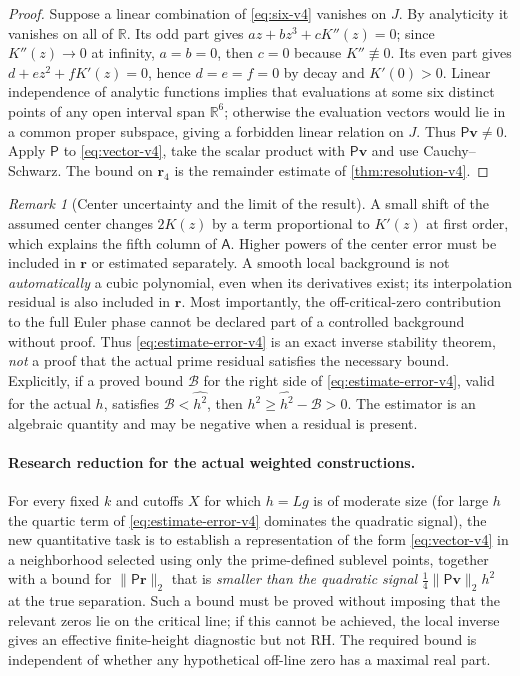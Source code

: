 \documentclass[11pt,a4paper]{article}
\numberwithin{equation}{section}
\theoremstyle{definition}
\theoremstyle{remark}
\newtheorem{remark}[theorem]{Remark}
\begin{document}
\begin{proof}
Suppose a linear combination of \eqref{eq:six-v4} vanishes on $J$.
By analyticity it vanishes on all of $\mathbb R$. Its odd part gives
$az+bz^3+cK''(z)=0$; since $K''(z)\to0$ at infinity,
$a=b=0$, then $c=0$ because $K''\not\equiv0$.
Its even part gives $d+ez^2+fK'(z)=0$, hence
$d=e=f=0$ by decay and $K'(0)>0$.
Linear independence of analytic functions implies that evaluations
at some six distinct points of any open interval span $\mathbb R^6$;
otherwise the evaluation vectors would lie in a common proper
subspace, giving a forbidden linear relation on $J$.
Thus $\mathsf P\mathbf v\ne0$. Apply $\mathsf P$ to
\eqref{eq:vector-v4}, take the scalar product with
$\mathsf P\mathbf v$ and use Cauchy--Schwarz. The bound on
$\mathbf r_4$ is the remainder estimate of \cref{thm:resolution-v4}.
\end{proof}

\begin{remark}[Center uncertainty and the limit of the result]
A small shift of the assumed center changes $2K(z)$ by a term
proportional to $K'(z)$ at first order, which explains the fifth
column of $\mathsf A$. Higher powers of the center error must be
included in $\mathbf r$ or estimated separately. A smooth local
background is not \emph{automatically} a cubic polynomial, even when
its derivatives exist; its interpolation residual is also included
in $\mathbf r$. Most importantly, the off-critical-zero contribution
to the full Euler phase cannot be declared part of a controlled
background without proof. Thus \eqref{eq:estimate-error-v4} is
an exact inverse stability theorem, \emph{not} a proof that the
actual prime residual satisfies the necessary bound. Explicitly, if a
proved bound $\mathcal B$ for the right side of
\eqref{eq:estimate-error-v4}, valid for the actual $h$, satisfies $\mathcal B<\widehat{h^2}$, then
$h^2\ge\widehat{h^2}-\mathcal B>0$. The estimator is an algebraic
quantity and may be negative when a residual is present.
\end{remark}

\paragraph{Research reduction for the actual weighted constructions.}
For every fixed $k$ and cutoffs $X$ for which $h=Lg$ is of moderate size (for large $h$ the quartic term of \eqref{eq:estimate-error-v4} dominates the quadratic signal), the
new quantitative task is to establish a representation of the
form \eqref{eq:vector-v4} in a neighborhood selected using only
the prime-defined sublevel points, together with a bound for
$\|\mathsf P\mathbf r\|_2$ that is \emph{smaller than the quadratic
signal} $\frac14\|\mathsf P\mathbf v\|_2h^2$ at the true separation. Such a bound must be
proved without imposing that the relevant zeros lie on the critical
line; if this cannot be achieved, the local inverse gives an effective
finite-height diagnostic but not RH. The required bound is independent of whether
any hypothetical off-line zero has a maximal real part.
\end{document}
